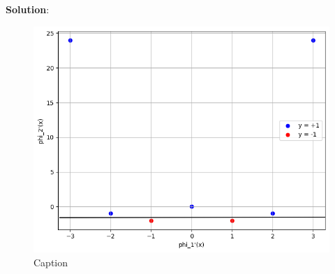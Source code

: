 \documentclass[submit]{../harvardml}
\newenvironment{solution}{
    \vspace{2mm}
    \color{blue}\noindent\textbf{Solution}:
}{}
\begin{document}
\begin{solution}
\begin{figure}[H]
    \centering
    \includegraphics[width=0.8\linewidth]{hw4/img_output/p1.8.png}
    \caption{Caption}
    \label{fig:enter-label}
\end{figure}
\end{solution}


\newpage

\end{document}
